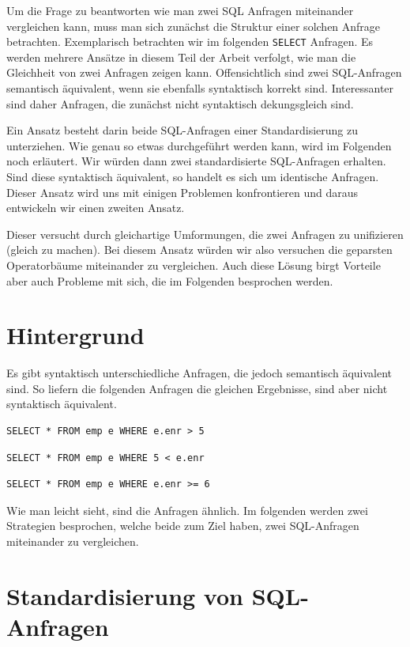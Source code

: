 Um die Frage zu beantworten wie man zwei SQL Anfragen miteinander vergleichen kann, muss man sich zunächst die Struktur einer solchen Anfrage betrachten. Exemplarisch betrachten wir im folgenden \verb|SELECT| Anfragen. Es werden mehrere Ansätze in diesem Teil der Arbeit verfolgt, wie man die Gleichheit von zwei Anfragen zeigen kann. Offensichtlich sind zwei SQL-Anfragen semantisch äquivalent, wenn sie ebenfalls syntaktisch korrekt sind. Interessanter sind daher Anfragen, die zunächst nicht syntaktisch dekungsgleich sind. 

Ein Ansatz besteht darin beide SQL-Anfragen einer Standardisierung zu unterziehen. Wie genau so etwas durchgeführt werden kann, wird im Folgenden noch erläutert. Wir würden dann zwei standardisierte SQL-Anfragen erhalten. Sind diese syntaktisch äquivalent, so handelt es sich um identische Anfragen. Dieser Ansatz wird uns mit einigen Problemen konfrontieren und daraus entwickeln wir einen zweiten Ansatz. 

Dieser versucht durch gleichartige Umformungen, die zwei Anfragen zu unifizieren (gleich zu machen). Bei diesem Ansatz würden wir also versuchen die geparsten Operatorbäume miteinander zu vergleichen. Auch diese Lösung birgt Vorteile aber auch Probleme mit sich, die im Folgenden besprochen werden.

\section{Hintergrund}

Es gibt syntaktisch unterschiedliche Anfragen, die jedoch semantisch äquivalent sind. So liefern die folgenden Anfragen die gleichen Ergebnisse, sind aber nicht syntaktisch äquivalent.

\begin{verbatim}
SELECT * FROM emp e WHERE e.enr > 5
\end{verbatim}

\begin{verbatim}
SELECT * FROM emp e WHERE 5 < e.enr
\end{verbatim}

\begin{verbatim}
SELECT * FROM emp e WHERE e.enr >= 6
\end{verbatim}

Wie man leicht sieht, sind die Anfragen ähnlich. Im folgenden werden zwei Strategien besprochen, welche beide zum Ziel haben, zwei SQL-Anfragen miteinander zu vergleichen.

\section{Standardisierung von SQL-Anfragen}

